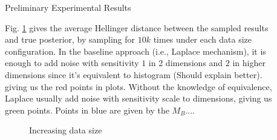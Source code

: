 \documentclass[final,hyperref={pdfpagelabels=false}]{beamer}
\begin{document}
\begin{frame}[t]
\begin{columns}[t]
\begin{column}{.485\textwidth}
\end{column} %

\begin{column}{.01\textwidth}\end{column} %
 
\begin{column}{.485\textwidth} %






\begin{block}{Preliminary Experimental Results}

  Fig. \ref{fig_sampling} gives the average Hellinger distance between the sampled results and true posterior, by sampling for $10k$ times under each data size configuration.
  In the baseline approach (i.e., Laplace mechanism), it is enough to add noise with sensitivity $1$ in 2 dimensions and $2$ in higher dimensions since it's equivalent to histogram
  (Should explain better).
  giving us the red points in plots. Without the knowledge of equivalence, Laplace usually add noise with sensitivity scale to dimensions, giving us green points.
  Points in blue are given by the $M_B...$.

\begin{figure}[H]
\begin{center}
\centering
  \caption{Increasing data size}
\label{fig_sampling}
\end{center}
\end{figure}


\end{block}
\end{column}
\end{columns}
\end{frame}
\end{document}
